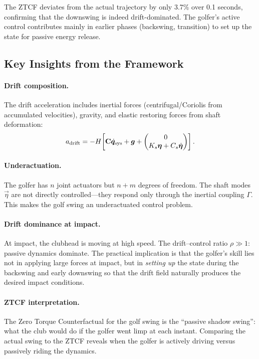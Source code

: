 The ZTCF deviates from the actual trajectory by only 3.7\% over 0.1 seconds, confirming
that the downswing is indeed drift-dominated. The golfer's active control contributes
mainly in earlier phases (backswing, transition) to set up the state for passive
energy release.

\subsection{Key Insights from the Framework}

\paragraph{Drift composition.}
The drift acceleration includes inertial forces (centrifugal/Coriolis from accumulated
velocities), gravity, and elastic restoring forces from shaft deformation:
\begin{equation}
a_{\text{drift}} = -H\!\left[\mathbf{C}\dot{\bm{q}}_{\text{sys}} + \bm{g}
+ \begin{pmatrix} 0 \\ K_s\bm{\eta} + C_s\dot{\bm{\eta}} \end{pmatrix}\right].
\label{eq:ch8:drift-golf}
\end{equation}

\paragraph{Underactuation.}
The golfer has $n$ joint actuators but $n+m$ degrees of freedom. The shaft modes
$\vec\eta$ are not directly controlled---they respond only through the inertial
coupling $\Gamma$. This makes the golf swing an underactuated control problem.

\paragraph{Drift dominance at impact.}
At impact, the clubhead is moving at high speed. The drift--control ratio $\rho \gg 1$:
passive dynamics dominate. The practical implication is that the golfer's skill lies
not in applying large forces at impact, but in \emph{setting up} the state during the
backswing and early downswing so that the drift field naturally produces the desired
impact conditions.

\paragraph{ZTCF interpretation.}
The Zero Torque Counterfactual for the golf swing is the ``passive shadow swing'':
what the club would do if the golfer went limp at each instant. Comparing the actual
swing to the ZTCF reveals when the golfer is actively driving versus passively riding
the dynamics.

